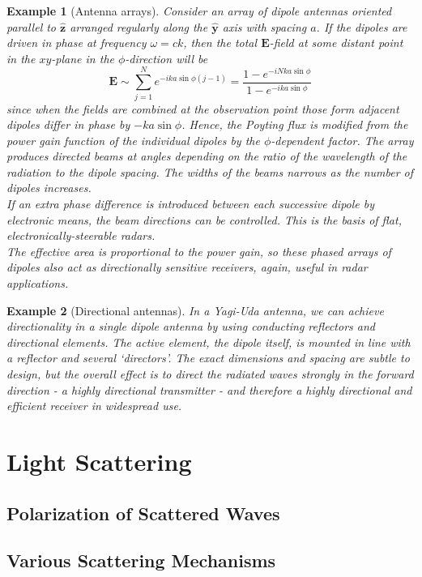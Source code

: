 \documentclass[a4paper]{article}
\newtheorem{eg}{Example}[section]
\theoremstyle{new}
\begin{document}
\begin{eg}[Antenna arrays]
Consider an array of dipole antennas oriented parallel to $\mathbf{\hat{z}}$ arranged regularly along the $\mathbf{\hat{y}}$ axis with spacing $a$. If the dipoles are driven in phase at frequency $\omega=ck$, then the total $\mathbf{E}$-field at some distant point in the $xy$-plane in the $\phi$-direction will be
$$\mathbf{E}\sim\sum_{j=1}^Ne^{-ika\sin\phi(j-1)}=\frac{1-e^{-iNka\sin\phi}}{1-e^{-ika\sin\phi}}$$
since when the fields are combined at the observation point those form adjacent dipoles differ in phase by $-ka\sin\phi$. Hence, the Poyting flux is modified from the power gain function of the individual dipoles by the $\phi$-dependent factor. The array produces directed beams at angles depending on the ratio of the wavelength of the radiation to the dipole spacing. The widths of the beams narrows as the number of dipoles increases.\\[5pt]
If an extra phase difference is introduced between each successive dipole by electronic means, the beam directions can be controlled. This is the basis of flat, electronically-steerable radars.\\[5pt]
The effective area is proportional to the power gain, so these phased arrays of dipoles also act as directionally sensitive receivers, again, useful in radar applications.
\end{eg}
\begin{eg}[Directional antennas]
In a Yagi-Uda antenna, we can achieve directionality in a single dipole antenna by using conducting reflectors and directional elements. The active element, the dipole itself, is mounted in line with a reflector and several `directors'. The exact dimensions and spacing are subtle to design, but the overall effect is to direct the radiated waves strongly in the forward direction - a highly directional transmitter - and therefore a highly directional and efficient receiver in widespread use.
\end{eg} 
\newpage
\section{Light Scattering}
\subsection{Polarization of Scattered Waves}
\subsection{Various Scattering Mechanisms}
\end{document}
